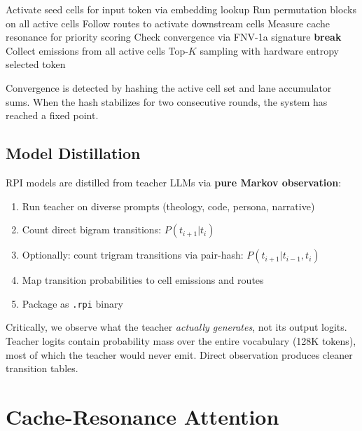 \documentclass[10pt,twocolumn]{article}
\begin{document}
\begin{algorithm}[h]
\caption{RPI Token Generation}
\label{alg:decode}
\begin{algorithmic}[1]
\STATE Activate seed cells for input token via embedding lookup
  \STATE Run permutation blocks on all active cells
  \STATE Follow routes to activate downstream cells
  \STATE Measure cache resonance for priority scoring
  \STATE Check convergence via FNV-1a signature
    \STATE \textbf{break}
  \ENDIF
\ENDFOR
\STATE Collect emissions from all active cells
\STATE Top-$K$ sampling with hardware entropy
\RETURN selected token
\end{algorithmic}
\end{algorithm}

Convergence is detected by hashing the active cell set and lane accumulator sums. When the hash stabilizes for two consecutive rounds, the system has reached a fixed point.

\subsection{Model Distillation}

RPI models are distilled from teacher LLMs via \textbf{pure Markov observation}:

\begin{enumerate}
\item Run teacher on diverse prompts (theology, code, persona, narrative)
\item Count direct bigram transitions: $P(t_{i+1} | t_i)$
\item Optionally: count trigram transitions via pair-hash: $P(t_{i+1} | t_{i-1}, t_i)$
\item Map transition probabilities to cell emissions and routes
\item Package as \texttt{.rpi} binary
\end{enumerate}

Critically, we observe what the teacher \emph{actually generates}, not its output logits. Teacher logits contain probability mass over the entire vocabulary (128K tokens), most of which the teacher would never emit. Direct observation produces cleaner transition tables.

\section{Cache-Resonance Attention}
\label{sec:cache}
\end{document}
